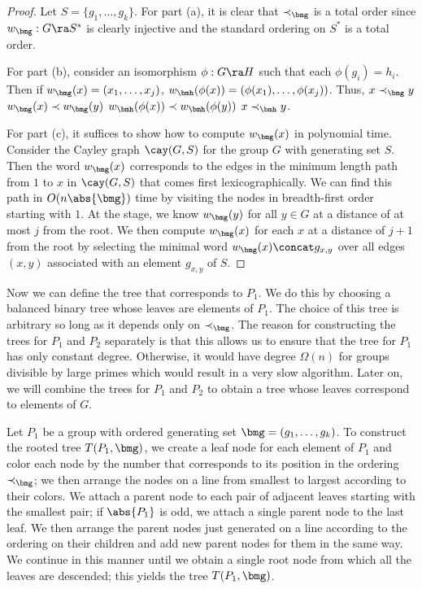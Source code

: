 \begin{proof}
  Let $S = \{g_1, \ldots, g_k\}$.  For part (a), it is clear that $\prec_{\bmg}$ is a total order since $w_{\bmg} : G \ra S^*$ is clearly injective and the standard ordering on $S^*$ is a total order.

  For part (b), consider an isomorphism $\phi : G \ra H$ such that each $\phi(g_i) = h_i$.  Then if $w_{\bmg}(x) = (x_1, \ldots, x_j)$, $w_{\bmh}(\phi(x)) = (\phi(x_1), \ldots, \phi(x_j))$.  Thus, $x \prec_{\bmg} y$ \ifft $w_{\bmg}(x) \prec w_{\bmg}(y)$ \ifft $w_{\bmh}(\phi(x)) \prec w_{\bmh}(\phi(y))$ \ifft $x \prec_{\bmh} y$.

  For part (c), it suffices to show how to compute $w_{\bmg}(x)$ in polynomial time.  Consider the Cayley graph $\cay(G, S)$ for the group $G$ with generating set $S$.  Then the word $w_{\bmg}(x)$ corresponds to the edges in the minimum length path from $1$ to $x$ in $\cay(G, S)$ that comes first lexicographically.  We can find this path in $O(n \abs{\bmg})$ time by visiting the nodes in breadth-first order starting with $1$.  At the  stage, we know $w_{\bmg}(y)$ for all $y \in G$ at a distance of at most $j$ from the root.  We then compute $w_{\bmg}(x)$ for each $x$ at a distance of $j + 1$ from the root by selecting the minimal word $w_{\bmg}(x) \concat g_{x, y}$ over all edges $(x, y)$ associated with an element $g_{x, y}$ of $S$.
\end{proof}

Now we can define the tree that corresponds to $P_1$.  We do this by choosing a balanced binary tree whose leaves are elements of $P_1$.  The choice of this tree is arbitrary so long as it depends only on $\prec_{\bmg}$.  The reason for constructing the trees for $P_1$ and $P_2$ separately is that this allows us to ensure that the tree for $P_1$ has only constant degree.  Otherwise, it would have degree $\Omega(n)$ for groups divisible by large primes which would result in a very slow algorithm.  Later on, we will combine the trees for $P_1$ and $P_2$ to obtain a tree whose leaves correspond to elements of $G$.

\begin{definition}
  \label{defn:TP}
  Let $P_1$ be a group with ordered generating set $\bmg = (g_1, \ldots, g_k)$.  To construct the rooted tree $T(P_1, \bmg)$, we create a leaf node for each element of $P_1$ and color each node by the number that corresponds to its position in the ordering $\prec_{\bmg}$; we then arrange the nodes on a line from smallest to largest according to their colors.  We attach a parent node to each pair of adjacent leaves starting with the smallest pair; if $\abs{P_1}$ is odd, we attach a single parent node to the last leaf.  We then arrange the parent nodes just generated on a line according to the ordering on their children and add new parent nodes for them in the same way.  We continue in this manner until we obtain a single root node from which all the leaves are descended; this yields the tree $T(P_1, \bmg)$.
\end{definition}

